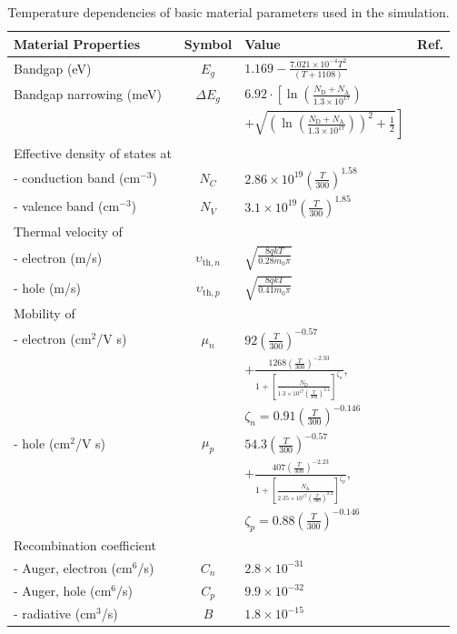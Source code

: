 \documentclass [sort&compress] {elsarticle}
\begin{document}
\begin{table}
\caption{\label{tabMaterial}Temperature dependencies of basic material parameters used in the simulation.
}
\begin{tabular}{lclc}
\hline
\hline
Material Properties&Symbol&Value&Ref.\\
\hline
Bandgap (eV) &$E_g$&$1.169 - \frac{7.021\times10^{-4} T^2}{(T + 1108)}$&\cite{Schroder2006}\\
Bandgap narrowing (meV)&$\Delta E_g$
&$6.92\cdot\left[\ln\left(\frac{N_\mathrm{D}+N_\mathrm{A}}{1.3\times10^{17}}\right)\right.$&\cite{Markvart,ZHOU20188}\\
&&$\left.+\sqrt{\left(\ln\left(\frac{N_\mathrm{D}+N_\mathrm{A}}{1.3\times10^{17}}\right)\right)^2+\frac{1}{2}}\right]$&\\
Effective density of states at&&&\\
 - conduction band (cm$^{-3}$)&$N_C$&$2.86\times10^{19}\left(\frac{T}{300}\right)^{1.58}$&\cite{Nc:Green}\\
 - valence band (cm$^{-3}$)&$N_V$&$3.1\times10^{19}\left(\frac{T}{300}\right)^{1.85}$&\cite{Nc:Green}\\
Thermal velocity of&&&\\
 - electron (m/s)& $\upsilon_{\mathrm{th},n}$&$\sqrt{\frac{8qkT}{0.28m_0\pi}}$&\cite{Nc:Green}\\
 - hole (m/s)& $\upsilon_{\mathrm{th},p}$&$\sqrt{\frac{8qkT}{0.41m_0\pi}}$&\cite{Nc:Green}\\
Mobility of &&&\\
 - electron (cm$^2$/V s)&$\mu_n$&$92\left(\frac{T}{300}\right)^{-0.57}$&\cite{Schroder2006}\\
&&$+\frac{1268\left(\frac{T}{300}\right)^{-2.33}}{1+
                             \left[\frac{N_\mathrm{D}}{1.3\times10^{17}\left(\frac{T}{300}\right)^{2.4}}\right]^{\zeta_n}}$,&\\
&&$\zeta_n=0.91\left(\frac{T}{300}\right)^{-0.146}$&\\
 - hole (cm$^2$/V s)&$\mu_p$&$54.3\left(\frac{T}{300}\right)^{-0.57}$&\cite{Schroder2006}\\
&&$+\frac{407\left(\frac{T}{300}\right)^{-2.23}}{1+
                             \left[\frac{N_\mathrm{A}}{2.35\times10^{17}\left(\frac{T}{300}\right)^{2.4}}\right]^{\zeta_p}}$,&\\
&&$\zeta_p=0.88\left(\frac{T}{300}\right)^{-0.146}$&\\
Recombination coefficient&&&\\
 - Auger, electron (cm$^6$/s) &$C_n$&$2.8\times10^{-31}$&\cite{Markvart}\\
 - Auger, hole  (cm$^6$/s) &$C_p$&$9.9\times10^{-32}$&\cite{Markvart}\\
 - radiative (cm$^3$/s) &$B$&$1.8\times10^{-15}$&\cite{Markvart}\\
\hline
\hline
\end{tabular}
\end{table}
\end{document}
